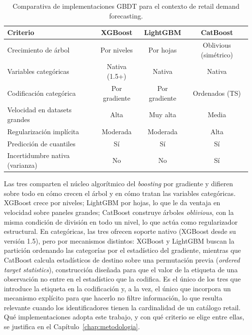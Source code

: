 \begin{table}[htbp]
    \centering
    \small
    \setlength{\tabcolsep}{5pt}
    \begin{tabular}{lccc}
        \toprule
        \textbf{Criterio} & \textbf{XGBoost} & \textbf{LightGBM} & \textbf{CatBoost} \\
        \midrule
        Crecimiento de árbol & Por niveles & Por hojas & Oblivious (simétrico) \\
        Variables categóricas & Nativa (1.5+) & Nativa & Nativa \\
        Codificación categórica & Por gradiente & Por gradiente & Ordenados (TS) \\
        Velocidad en datasets grandes & Alta & Muy alta & Media \\
        Regularización implícita & Moderada & Moderada & Alta \\
        Predicción de cuantiles & Sí & Sí & Sí \\
        Incertidumbre nativa (varianza) & No & No & Sí \\
        \bottomrule
    \end{tabular}
    \caption{Comparativa de implementaciones GBDT para el contexto de retail demand fore\-cast\-ing.}
    \label{tab:gbdt_comparison}
\end{table}

Las tres comparten el núcleo algorítmico del \textit{boosting} por gradiente y difieren
sobre todo en cómo crecen el árbol y en cómo tratan las variables categóricas. XGBoost crece
por niveles; LightGBM por hojas, lo que le da ventaja en velocidad sobre paneles grandes;
CatBoost construye árboles \textit{oblivious}, con la misma condición de división en todo un
nivel, lo que actúa como regularizador estructural. En categóricas, las tres ofrecen soporte
nativo (XGBoost desde su versión 1.5), pero por mecanismos distintos: XGBoost y LightGBM
buscan la partición ordenando las categorías por el estadístico del gradiente, mientras que
CatBoost calcula estadísticos de destino sobre una permutación previa
(\textit{ordered target statistics}), construcción diseñada para que el valor de la etiqueta de
una observación no entre en el estadístico que la codifica. Es el único de los tres que
introduce la etiqueta en la codificación y, a la vez, el único que incorpora un mecanismo
explícito para que hacerlo no filtre información, lo que resulta relevante cuando los
identificadores tienen la cardinalidad de un catálogo retail. Qué implementaciones adopta este
trabajo, y con qué criterio se elige entre ellas, se justifica en el
Capítulo~\ref{chap:metodologia}.

